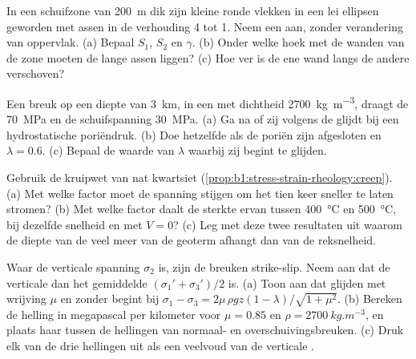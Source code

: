 \begin{exercise}[$\star\star$]\label{exo:b1:stress-strain-rheology:7}
In een schuifzone van \qty{200}{m} dik zijn kleine ronde vlekken in een lei ellipsen geworden met assen in de verhouding 4 tot 1. Neem een  aan, zonder verandering van oppervlak. (a) Bepaal $S_1$, $S_2$ en $\gamma$. (b) Onder welke hoek met de wanden van de zone moeten de lange assen liggen? (c) Hoe ver is de ene wand langs de andere verschoven?
\end{exercise}

\begin{exercise}[$\star\star$]\label{exo:b1:stress-strain-rheology:8}
Een breuk op een diepte van \qty{3}{km}, in een  met dichtheid \qty{2700}{kg.m^{-3}}, draagt de  \qty{70}{MPa} en de schuifspanning \qty{30}{MPa}. (a) Ga na of zij volgens de  glijdt bij een hydrostatische poriëndruk. (b) Doe hetzelfde als de poriën zijn afgesloten en $\lambda = 0.6$. (c) Bepaal de waarde van $\lambda$ waarbij zij begint te glijden.
\end{exercise}

\begin{exercise}[$\star\star$]\label{exo:b1:stress-strain-rheology:9}
Gebruik de kruipwet van nat kwartsiet (\cref{prop:b1:stress-strain-rheology:creep}). (a) Met welke factor moet de spanning stijgen om het tien keer sneller te laten stromen? (b) Met welke factor daalt de sterkte ervan tussen \qty{400}{\degreeCelsius} en \qty{500}{\degreeCelsius}, bij dezelfde snelheid en met $V = 0$? (c) Leg met deze twee resultaten uit waarom de diepte van de  veel meer van de geoterm afhangt dan van de reksnelheid.
\end{exercise}

\begin{exercise}[$\star\star\star$]\label{exo:b1:stress-strain-rheology:10}
Waar de verticale spanning $\sigma_2$ is, zijn de breuken strike-slip. Neem aan dat de verticale  dan het gemiddelde $(\sigma_1' + \sigma_3')/2$ is. (a) Toon aan dat glijden met wrijving $\mu$ en zonder  begint bij $\sigma_1 - \sigma_3 = 2\mu\,\rho g z(1-\lambda)/\sqrt{1+\mu^2}$. (b) Bereken de helling in megapascal per kilometer voor $\mu = 0.85$ en $\rho = \qty{2700}{kg.m^{-3}}$, en plaats haar tussen de hellingen van normaal- en overschuivingsbreuken. (c) Druk elk van de drie hellingen uit als een veelvoud van de verticale .
\end{exercise}

